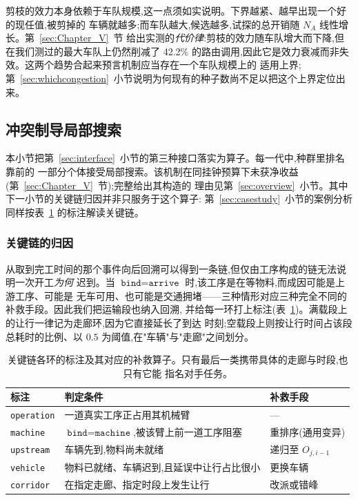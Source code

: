 \documentclass[manuscript,screen,review]{acmart}
\newcommand{\RouteCallCutLo}{42.2\%}     %
\begin{document}
剪枝的效力本身依赖于车队规模,这一点须如实说明。下界越紧、越早出现一个好的现任值,被剪掉的
车辆就越多;而车队越大,候选越多,试探的总开销随 $N_A$ 线性增长。第~\ref{sec:Chapter_V}~节
给出实测的\emph{代价律}:剪枝的效力随车队增大而下降,但在我们测过的最大车队上仍然削减了
\RouteCallCutLo{} 的路由调用,因此它是效力衰减而非失效。这两个趋势合起来预言机制应当存在一个车队规模上的
适用上界;第~\ref{sec:whichcongestion}~小节说明为何现有的种子数尚不足以把这个上界定位出来。

\subsection{冲突制导局部搜索}
\label{sec:ls}

本小节把第~\ref{sec:interface}~小节的第三种接口落实为算子。每一代中,种群里排名靠前的
一部分个体接受局部搜索。该机制在同挂钟预算下未获净收益(第~\ref{sec:Chapter_V}~节);完整给出其构造的
理由见第~\ref{sec:overview}~小节。其中下一小节的关键链归因并非只服务于这个算子:
第~\ref{sec:casestudy}~小节的案例分析同样按表~\ref{tab:attrib} 的标注解读关键链。

\subsubsection{关键链的归因}
从取到完工时间的那个事件向后回溯可以得到一条链,但仅由工序构成的链无法说明一次开工\emph{为何}
迟到。当 $\texttt{bind}=\texttt{arrive}$ 时,该工序是在等物料,而成因可能是上游工序、可能是
无车可用、也可能是交通拥堵——三种情形对应三种完全不同的补救手段。因此我们把运输段也纳入回溯,
并给每一环打上标注(表~\ref{tab:attrib})。满载段上的让行一律记为走廊环,因为它直接延长了到达
时刻;空载段上则按让行时间占该段总耗时的比例、以 $0.5$ 为阈值,在"车辆"与"走廊"之间划分。

\begin{table}[t]
\caption{关键链各环的标注及其对应的补救算子。只有最后一类携带具体的走廊与时段,也只有它能
指名对手任务。}
\label{tab:attrib}
\footnotesize
\begin{tabular}{@{}llp{2.55cm}@{}}
\toprule
标注 & 判定条件 & 补救手段 \\
\midrule
\texttt{operation} & 一道真实工序正占用其机械臂 & --- \\
\texttt{machine} & $\texttt{bind}=\texttt{machine}$,被该臂上前一道工序阻塞
  & 重排序(通用变异) \\
\texttt{upstream} & 车辆先到,物料尚未就绪 & 递归至 $O_{j,i-1}$ \\
\texttt{vehicle} & 物料已就绪、车辆迟到,且延误中让行占比很小 & 更换车辆 \\
\texttt{corridor} & 在指定走廊、指定时段上发生让行 & 改派或错峰 \\
\bottomrule
\end{tabular}
\end{table}
\end{document}
